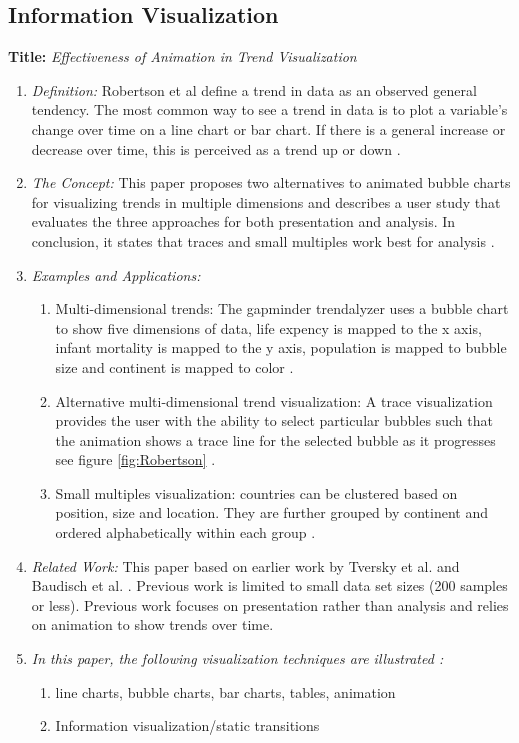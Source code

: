 \documentclass{egpubl}
\begin{document}
\subsection{Information Visualization}
\textbf{Title:} \textit{Effectiveness of Animation in Trend Visualization}
\begin{enumerate}
\item \textit{Definition:} Robertson et al define a trend in data as an observed general tendency. The most common way to see a trend in data is to plot a variable's change over time on a line chart or bar chart. If there is a general increase or decrease over time, this is perceived as a trend up or down \cite{Rebortson}.
\item \textit{The Concept:} This paper proposes two alternatives to animated bubble charts for visualizing trends in multiple dimensions and describes a user study that evaluates the three approaches for both presentation and analysis. In conclusion, it states that traces and small multiples work best for analysis \cite{Rebortson}.
\item  \textit{Examples and Applications:} 
\begin{enumerate}
\item Multi-dimensional trends: The gapminder trendalyzer uses a bubble chart to show five dimensions of data, life expency is mapped to the x axis, infant mortality is mapped to the y axis, population is mapped to bubble size and continent is mapped to color \cite{ted1}.
\item Alternative multi-dimensional trend visualization: A trace visualization provides the user with the ability to select particular bubbles such that the animation shows a trace line for the selected bubble as it progresses  see figure \ref{fig:Robertson} \cite{ted2}.
\item Small multiples visualization: countries can be clustered based on position, size and location. They are further grouped by continent and ordered alphabetically within each group \cite{Tufte}.
\end{enumerate}
\item \textit{Related Work:} This paper based on earlier work by Tversky et al. \cite{tversky} and Baudisch et al. \cite{baudisch}. Previous work is limited to small data set sizes (200 samples or less). Previous work focuses on presentation rather than analysis and relies on animation to show trends over time.
\item \textit{In this paper, the following visualization techniques are illustrated :} 
\begin{enumerate}
\item line charts, bubble charts, bar charts, tables, animation
\item Information visualization/static transitions
\end{enumerate}
\end{enumerate}
\end{document}
